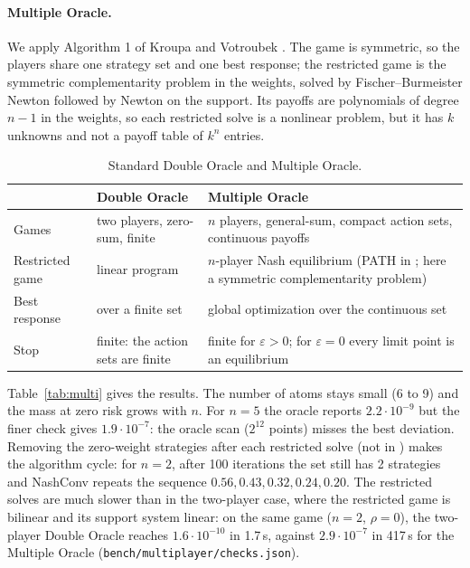 \documentclass[10pt,a4paper]{article}
\begin{document}
\paragraph{Multiple Oracle.} We apply Algorithm 1 of Kroupa and Votroubek \cite{kroupa2021}. The
game is symmetric, so the players share one strategy set and one best response; the restricted
game is the symmetric complementarity problem in the weights, solved by Fischer--Burmeister
Newton followed by Newton on the support. Its payoffs are polynomials of degree $n-1$ in the
weights, so each restricted solve is a nonlinear problem, but it has $k$ unknowns and not a
payoff table of $k^n$ entries.

\begin{table}[H]
\centering\small
\begin{tabular}{p{3cm}p{6.3cm}p{6.3cm}}
\toprule
 & Double Oracle \cite{mcmahan2003} & Multiple Oracle \cite{kroupa2021} \\
\midrule
Games & two players, zero-sum, finite & $n$ players, general-sum, compact action sets, continuous payoffs \\
Restricted game & linear program & $n$-player Nash equilibrium (PATH in \cite{kroupa2021}; here a symmetric complementarity problem) \\
Best response & over a finite set & global optimization over the continuous set \\
Stop & finite: the action sets are finite & finite for $\varepsilon>0$; for $\varepsilon=0$ every limit point is an equilibrium \\
\bottomrule
\end{tabular}
\caption{Standard Double Oracle and Multiple Oracle.}
\end{table}

\begin{table}[H]
\centering\small

\caption{Multiple Oracle, $\tau=0.03$, $P=1$, $\rho=0$, 400\,s limit, 2 threads. Check: NashConv with a finer
best response. Atoms: groups of support points less than $2\cdot10^{-3}$ apart.}
\label{tab:multi}
\end{table}

Table~\ref{tab:multi} gives the results. The number of atoms stays small (6 to 9) and the mass
at zero risk grows with $n$. For $n=5$ the oracle reports $2.2\cdot10^{-9}$ but the finer check
gives $1.9\cdot10^{-7}$: the oracle scan ($2^{12}$ points) misses the best deviation. Removing the
zero-weight strategies after each restricted solve (not in \cite{kroupa2021}) makes the algorithm
cycle: for $n=2$, after 100 iterations the set still has 2 strategies and NashConv repeats the
sequence $0.56, 0.43, 0.32, 0.24, 0.20$. The restricted solves are much slower than in the
two-player case, where the restricted game is bilinear and its support system linear: on the same
game ($n=2$, $\rho=0$), the two-player Double Oracle reaches $1.6\cdot10^{-10}$ in 1.7\,s,
against $2.9\cdot10^{-7}$ in 417\,s for the Multiple Oracle (\texttt{bench/multiplayer/checks.json}).
\end{document}
